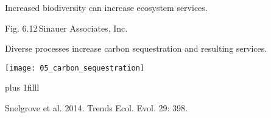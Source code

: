 \documentclass[t]{beamer}
\begin{document}
%
{
\begin{frame}[b]{Increased biodiversity can increase ecosystem services.}


\hfill\tiny Fig. 6.12\,\textcopyright Sinauer Associates, Inc.
\end{frame}
}
%
\begin{frame}[t]{Diverse processes increase carbon sequestration and resulting services.}

		\vspace*{-0.85\baselineskip}
		
		\texttt{[image: 05\_carbon\_sequestration]}
		
	\vskip0pt plus 1filll
	
	\hfill\tiny Snelgrove et al. 2014. Trends Ecol. Evol.  29: 398.

\end{frame}
\end{document}
